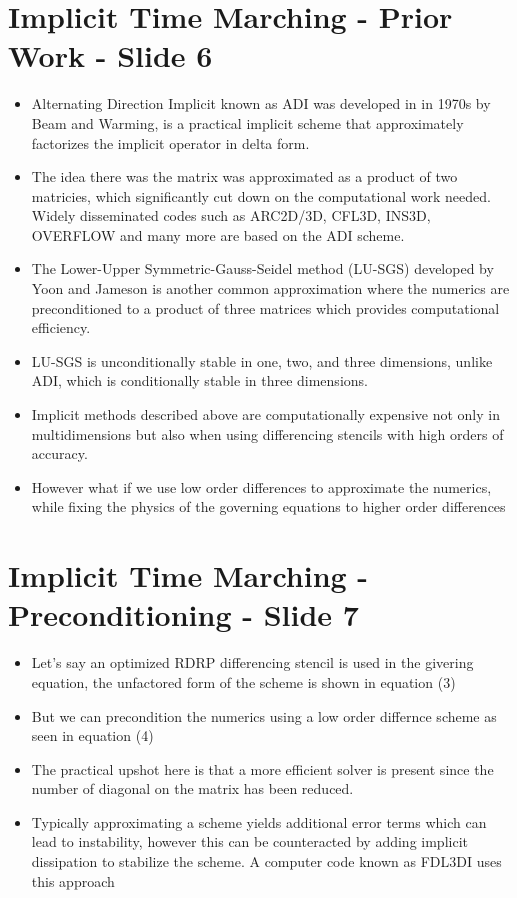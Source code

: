 \documentclass[a4paper,17pt]{extarticle}
\begin{document}
\pagebreak \section*{Implicit Time Marching - Prior Work - Slide 6}
\begin{itemize}
   \item Alternating Direction Implicit known as ADI was developed in in 1970s by Beam and Warming, 
         is a practical implicit scheme that approximately factorizes the implicit operator in delta 
         form. 
   \item The idea there was the matrix was approximated as a product of two matricies, which
         significantly cut down on the computational work needed. Widely disseminated codes such as
         ARC2D/3D, CFL3D, INS3D, OVERFLOW and many more are based on the ADI scheme.
   \item The Lower-Upper Symmetric-Gauss-Seidel method (LU-SGS) developed by Yoon and Jameson is 
         another common approximation where the numerics are preconditioned to a product of three 
         matrices which provides computational efficiency. 
   \item LU-SGS is unconditionally stable in one, two, and three dimensions, unlike ADI, which is
         conditionally stable in three dimensions. 
   \item Implicit methods described above are computationally expensive not only in multidimensions
         but also when using differencing stencils with high orders of accuracy.
   \item However what if we use low order differences to approximate the numerics, while fixing
      the physics of the governing equations to higher order differences
\end{itemize}

\pagebreak \section*{Implicit Time Marching - Preconditioning - Slide 7}
\begin{itemize}
   \item Let's say an optimized RDRP differencing stencil is used in the givering equation, the
         unfactored form of the scheme is shown in equation (3)
   \item But we can precondition the numerics using a low order differnce scheme as seen in equation
         (4)
   \item The practical upshot here is that a more efficient solver is present since the number of
         diagonal on the matrix has been reduced.
   \item Typically approximating a scheme yields additional error terms which can lead to
         instability, however this can be counteracted by adding implicit dissipation to stabilize
         the scheme. A computer code known as FDL3DI uses this approach
\end{itemize}
\end{document}
